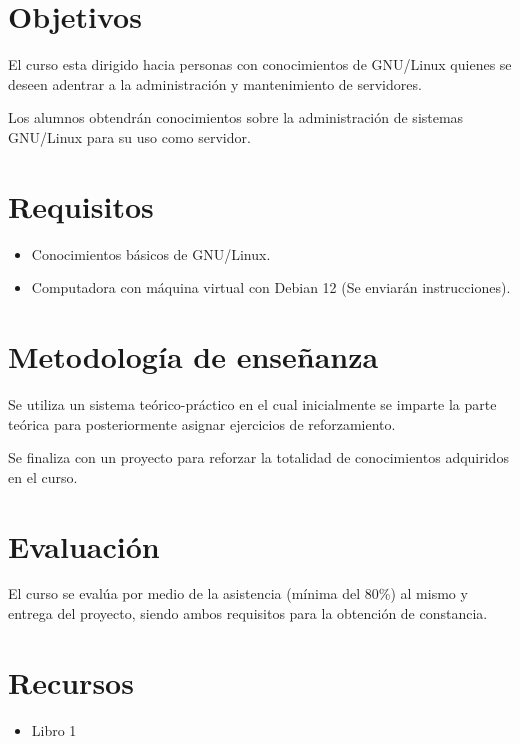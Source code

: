 \documentclass[a4paper,11pt]{article}                 %
\begin{document}
  \section{Objetivos}
    El curso esta dirigido hacia personas con conocimientos de GNU/Linux quienes se deseen adentrar a la administración y mantenimiento de servidores.

    Los alumnos obtendrán conocimientos sobre la administración de sistemas GNU/Linux para su uso como servidor.

  \section{Requisitos}
    \begin{itemize}
      \item Conocimientos básicos de GNU/Linux.
      \item Computadora con máquina virtual con Debian 12 (Se enviarán instrucciones).
    \end{itemize}

  \section{Metodología de enseñanza}
    Se utiliza un sistema teórico-práctico en el cual inicialmente se imparte la parte teórica para posteriormente asignar ejercicios de reforzamiento.

    Se finaliza con un proyecto para reforzar la totalidad de conocimientos adquiridos en el curso.

  \section{Evaluación}
    El curso se evalúa por medio de la asistencia (mínima del 80\%) al mismo y entrega del proyecto, siendo ambos requisitos para la obtención de constancia.

  \section{Recursos}
    \begin{itemize}
      \item Libro 1
    \end{itemize}
\end{document}
